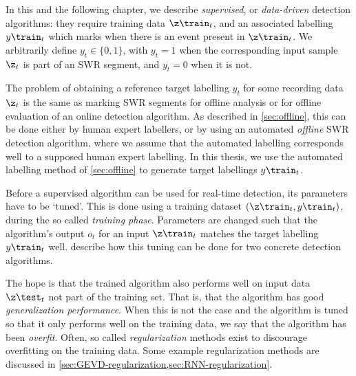 \label{sec:data-driven-algorithms}

In this and the following chapter, we describe \emph{supervised}, or \emph{data-driven} detection algorithms: they require training data $\z\train_t$, and an associated labelling $y\train_t$ which marks when there is an event present in $\z\train_t$. We arbitrarily define $y_t \in \{0, 1\}$, with $y_t = 1$ when the corresponding input sample $\z_t$ is part of an SWR segment, and $y_t = 0$ when it is not.

The problem of obtaining a reference target labelling $y_t$ for some recording data $\z_t$ is the same as marking SWR segments for offline analysis or for offline evaluation of an online detection algorithm. As described in \cref{sec:offline}, this can be done either by human expert labellers, or by using an automated \emph{offline} SWR detection algorithm, where we assume that the automated labelling corresponds well to a supposed human expert labelling. In this thesis, we use the automated labelling method of \cref{sec:offline} to generate target labellings $y\train_t$.

Before a supervised algorithm can be used for real-time detection, its parameters have to be `tuned'. This is done using a training dataset $(\z\train_t, y\train_t)$, during the so called \emph{training phase}. Parameters are changed such that the algorithm's output $o_t$ for an input $\z\train_t$ matches the target labelling $y\train_t$ well.  describe how this tuning can be done for two concrete detection algorithms.

The hope is that the trained algorithm also performs well on input data $\z\test_t$ not part of the training set. That is, that the algorithm has good \emph{generalization performance}. When this is not the case and the algorithm is tuned so that it only performs well on the training data, we say that the algorithm has been \emph{overfit}. Often, so called \emph{regularization} methods exist to discourage overfitting on the training data. Some example regularization methods are discussed in \cref{sec:GEVD-regularization,sec:RNN-regularization}.
